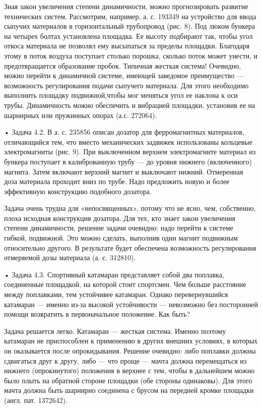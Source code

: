 Зная  закон  увеличения  степени  динамичности,  можно  прогнозировать
развитие  технических систем.  Рассмотрим, например,  а. с.  193349 на
устройство для  ввода сыпучих материалов в  горизонтальный трубопровод
(рис. 8).  Под люком бункера  на четырех болтах  установлена площадка.
Ее  высоту подбирают  так,  чтобы угол  откоса  материала не  позволял
ему  высыпаться   за  пределы   площадки.  Благодаря  этому   в  поток
воздуха  поступает  столько  порошка,   сколько  поток  может  унести,
и  предотвращается  образование   пробок.  Типичная  жесткая  система!
Очевидно,  можно  перейти  к  динамичной  системе,  имеющей  заведомое
преимущество  — возможность  регулирования подачи  сыпучего материала.
Для этого  необходимо выполнить площадку подвижной,чтобы  мог меняться
угол ее наклона к оси трубы. Динамичность можно обеспечить и вибрацией
площадки,  установив  ее  на  шарнирных  или  пружинных  опорах  (а.с.
272064).

•  Задача  4.2. В  а.  с.  235856  описан дозатор  для  ферромагнитных
материалов,  отличающийся   тем,  что  вместо   механических  задвижек
использованы  кольцевые  электромагниты   (рис.  9).  При  выключенном
верхнем электромагните  материал из бункера поступает  в калиброванную
трубу  —  до  уровня  нижнего (включенного)  магнита.  Затем  включают
верхний магнит и выключают  нижний. Отмеренная доза материала проходит
вниз по трубе.  Надо предложить новую и  более эффективную конструкцию
подобного дозатора.

Задача  очень трудна  для «непосвященных»,  потому что  не ясно,  чем,
собственно, плоха  исходная конструкция  дозатора. Для тех,  кто знает
закон увеличения  степени динамичности, решение задачи  очевидно: надо
перейти к системе гибкой, подвижной.  Это можно сделать, выполнив один
магнит подвижным  относительно другого. В результате  будет обеспечена
возможность регулирования отмеряемой дозы материала (а. с. 312810).

• Задача  4.3. Спортивный  катамаран представляет собой  два поплавка,
соединенные  площадкой,   на  которой  стоит  спортсмен.   Чем  больше
расстояние   между  поплавками,   тем  устойчивее   катамаран.  Однако
перевернувшийся  катамаран  —  именно  из-за  высокой  устойчивости  —
невозможно   без  посторонней   помощи  возвратить   в  первоначальное
положение. Как быть?

Задача  решается легко.  Катамаран —  жесткая система.  Именно поэтому
катамаран не  приспособлен к применению  в других внешних  условиях, в
которых  он оказывается  после опрокидывания.  Решение очевидно:  либо
поплавки должны  сдвигаться друг  к другу,  либо —  что проще  — мачта
должна  перемещаться из  нижнего  (опрокинутого)  положения в  верхнее
с  тем,  чтобы в  дальнейшем  можно  было  плыть на  обратной  стороне
площадки (обе стороны одинаковы). Для этого мачта должна быть шарнирно
соединена с брусом на передней кромке площадки (англ. пат. 1372642).

